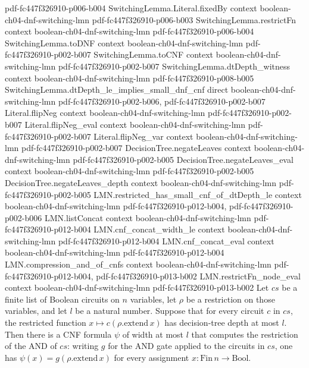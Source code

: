 \begin{lemma}
  {pdf-fc447f326910-p006-b004}
\proofstep
  {SwitchingLemma.Literal.fixedBy}
  {context}
  {boolean-ch04-dnf-switching-lmn}
  {pdf-fc447f326910-p006-b003}
\proofstep
  {SwitchingLemma.restrictFn}
  {context}
  {boolean-ch04-dnf-switching-lmn}
  {pdf-fc447f326910-p006-b004}
\proofstep
  {SwitchingLemma.toDNF}
  {context}
  {boolean-ch04-dnf-switching-lmn}
  {pdf-fc447f326910-p002-b007}
\proofstep
  {SwitchingLemma.toCNF}
  {context}
  {boolean-ch04-dnf-switching-lmn}
  {pdf-fc447f326910-p002-b007}
\proofstep
  {SwitchingLemma.dtDepth_witness}
  {context}
  {boolean-ch04-dnf-switching-lmn}
  {pdf-fc447f326910-p008-b005}
\proofstep
  {SwitchingLemma.dtDepth_le_implies_small_dnf_cnf}
  {direct}
  {boolean-ch04-dnf-switching-lmn}
  {pdf-fc447f326910-p002-b006,
    pdf-fc447f326910-p002-b007}
\proofstep
  {Literal.flipNeg}
  {context}
  {boolean-ch04-dnf-switching-lmn}
  {pdf-fc447f326910-p002-b007}
\proofstep
  {Literal.flipNeg_eval}
  {context}
  {boolean-ch04-dnf-switching-lmn}
  {pdf-fc447f326910-p002-b007}
\proofstep
  {Literal.flipNeg_var}
  {context}
  {boolean-ch04-dnf-switching-lmn}
  {pdf-fc447f326910-p002-b007}
\proofstep
  {DecisionTree.negateLeaves}
  {context}
  {boolean-ch04-dnf-switching-lmn}
  {pdf-fc447f326910-p002-b005}
\proofstep
  {DecisionTree.negateLeaves_eval}
  {context}
  {boolean-ch04-dnf-switching-lmn}
  {pdf-fc447f326910-p002-b005}
\proofstep
  {DecisionTree.negateLeaves_depth}
  {context}
  {boolean-ch04-dnf-switching-lmn}
  {pdf-fc447f326910-p002-b005}
\proofstep
  {LMN.restricted_has_small_cnf_of_dtDepth_le}
  {context}
  {boolean-ch04-dnf-switching-lmn}
  {pdf-fc447f326910-p012-b004,
    pdf-fc447f326910-p002-b006}
\proofstep
  {LMN.listConcat}
  {context}
  {boolean-ch04-dnf-switching-lmn}
  {pdf-fc447f326910-p012-b004}
\proofstep
  {LMN.cnf_concat_width_le}
  {context}
  {boolean-ch04-dnf-switching-lmn}
  {pdf-fc447f326910-p012-b004}
\proofstep
  {LMN.cnf_concat_eval}
  {context}
  {boolean-ch04-dnf-switching-lmn}
  {pdf-fc447f326910-p012-b004}
\proofstep
  {LMN.compression_and_of_cnfs}
  {context}
  {boolean-ch04-dnf-switching-lmn}
  {pdf-fc447f326910-p012-b004,
    pdf-fc447f326910-p013-b002}
\proofstep
  {LMN.restrictFn_node_eval}
  {context}
  {boolean-ch04-dnf-switching-lmn}
  {pdf-fc447f326910-p013-b002}
Let $cs$ be a finite list of Boolean circuits on $n$ variables, let $\rho$ be a
restriction on those variables, and let $l$ be a natural number. Suppose that for every
circuit $c$ in $cs$, the restricted function $x \mapsto c(\rho.\mathrm{extend}\,x)$ has
decision-tree depth at most $l$. Then there is a CNF formula $\psi$ of width at most $l$
that computes the restriction of the AND of $cs$: writing $g$ for the AND gate applied
to the circuits in $cs$, one has $\psi(x) = g(\rho.\mathrm{extend}\,x)$ for every
assignment $x : \mathrm{Fin}\,n \to \mathrm{Bool}$.
\end{lemma}

